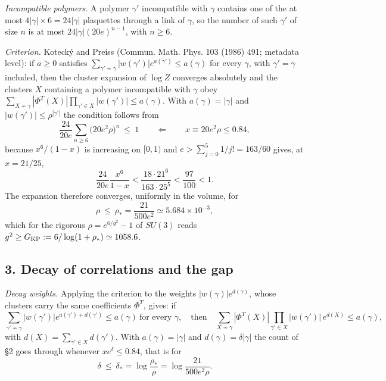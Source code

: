 \documentclass[11pt,a4paper]{article}
\begin{document}
\emph{Incompatible polymers.} A polymer \(\gamma'\) incompatible with
\(\gamma\) contains one of the at most \(4|\gamma|\times6=24|\gamma|\)
plaquettes through a link of \(\gamma\), so the number of such
\(\gamma'\) of size \(n\) is at most \(24|\gamma|(20e)^{n-1}\), with
\(n\ge6\).

\emph{Criterion.} Kotecký and Preiss (Commun. Math. Phys. 103 (1986)
491; metadata level): if \(a\ge0\) satisfies
\(\sum_{\gamma'\not\sim\gamma}|w(\gamma')|e^{a(\gamma')}\le a(\gamma)\)
for every \(\gamma\), with \(\gamma'=\gamma\) included, then the cluster
expansion of \(\log Z\) converges absolutely and the clusters \(X\)
containing a polymer incompatible with \(\gamma\) obey
\(\sum_{X\not\sim\gamma}|\Phi^T(X)|\prod_{\gamma'\in X}|w(\gamma')|\le a(\gamma)\).
With \(a(\gamma)=|\gamma|\) and \(|w(\gamma')|\le\rho^{|\gamma'|}\) the
condition follows from
\[\frac{24}{20e}\sum_{n\ge6}\big(20e^2\rho\big)^n\ \le\ 1
\qquad\Longleftarrow\qquad x\equiv20e^2\rho\le0.84 ,\] because
\(x^6/(1-x)\) is increasing on \([0,1)\) and
\(e>\sum_{j=0}^5 1/j!=163/60\) gives, at \(x=21/25\),
\[\frac{24}{20e}\frac{x^6}{1-x}
<\frac{18\cdot21^6}{163\cdot25^5}<\frac{97}{100}<1.\] The expansion
therefore converges, uniformly in the volume, for
\[\rho\ \le\ \rho_*=\frac{21}{500e^2}\simeq5.684\times10^{-3},\] which
for the rigorous \(\rho=e^{6/g^2}-1\) of \(SU(3)\) reads
\(g^2\ge G_{\rm KP}:=6/\log(1+\rho_*)\simeq1058.6\).

\hypertarget{decay-of-correlations-and-the-gap}{%
\subsection{3. Decay of correlations and the
gap}\label{decay-of-correlations-and-the-gap}}

\emph{Decay weights.} Applying the criterion to the weights
\(|w(\gamma)|e^{d(\gamma)}\), whose clusters carry the same coefficients
\(\Phi^T\), gives: if
\[\sum_{\gamma'\not\sim\gamma}|w(\gamma')|e^{a(\gamma')+d(\gamma')}\le a(\gamma)\ \text{for every }\gamma,
\quad\text{then}\quad
\sum_{X\not\sim\gamma}|\Phi^T(X)|\prod_{\gamma'\in X}|w(\gamma')|\,e^{d(X)}\le a(\gamma),\]
with \(d(X)=\sum_{\gamma'\in X}d(\gamma')\). With \(a(\gamma)=|\gamma|\)
and \(d(\gamma)=\delta|\gamma|\) the count of §2 goes through whenever
\(xe^\delta\le0.84\), that is for
\[\delta\ \le\ \delta_*=\log\frac{\rho_*}{\rho}
=\log\frac{21}{500e^2\rho}.\]
\end{document}
